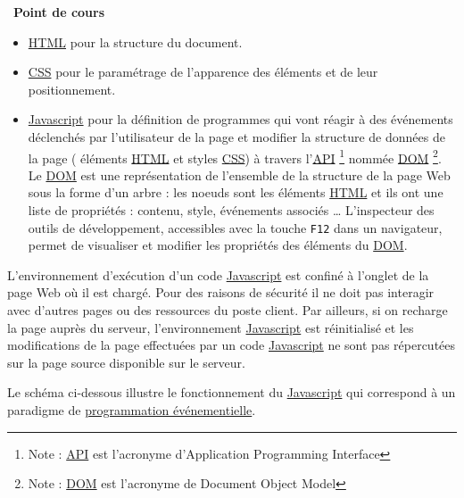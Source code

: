 \documentclass[
  11pt,
]{article}
\newcommand{\passthrough}[1]{#1}
\providecommand{\tightlist}{%
  \setlength{\itemsep}{0pt}\setlength{\parskip}{0pt}}
\newcounter{prop}
\newcounter{cours}
\newenvironment{cours}[1]
{\par \medskip   \addtocounter{cours}{1} \noindent  
\begin{bclogo}[arrondi =0.1,  ombre = true, barre=none, logo=\bcbook, marge=4]{~\textbf{Point de cours} \textbf{\thecours} {\itshape #1} }  \par}
{
\end{bclogo}
 \par \bigskip }
\newcounter{prog}
\begin{document}
\begin{cours}{}
\begin{itemize}
\tightlist
\item
  \href{https://developer.mozilla.org/fr/docs/Glossaire/HTML}{HTML} pour
  la structure du document.
\item
  \href{https://developer.mozilla.org/fr/docs/Glossaire/CSS}{CSS} pour
  le paramétrage de l'apparence des éléments et de leur positionnement.
\item
  \href{https://developer.mozilla.org/fr/docs/Glossaire/JavaScript}{Javascript}
  pour la définition de programmes qui vont réagir à des événements
  déclenchés par l'utilisateur de la page et modifier la structure de
  données de la page ( éléments
  \href{https://developer.mozilla.org/fr/docs/Glossaire/HTML}{HTML} et
  styles
  \href{https://developer.mozilla.org/fr/docs/Glossaire/CSS}{CSS}) à
  travers
  l'\href{https://developer.mozilla.org/fr/docs/Glossaire/API}{API}
  \footnote{Note :
    \href{https://developer.mozilla.org/fr/docs/Glossaire/API}{API} est
    l'acronyme d'Application Programming Interface} nommée
  \href{https://developer.mozilla.org/fr/docs/Glossaire/DOM}{DOM}
  \footnote{Note :
    \href{https://developer.mozilla.org/fr/docs/Glossaire/DOM}{DOM} est
    l'acronyme de Document Object Model}. Le
  \href{https://developer.mozilla.org/fr/docs/Glossaire/DOM}{DOM} est
  une représentation de l'ensemble de la structure de la page Web sous
  la forme d'un arbre : les noeuds sont les éléments
  \href{https://developer.mozilla.org/fr/docs/Glossaire/HTML}{HTML} et
  ils ont une liste de propriétés : contenu, style, événements associés
  \ldots{} L'inspecteur des outils de développement, accessibles avec la
  touche \passthrough{\lstinline!F12!} dans un navigateur, permet de
  visualiser et modifier les propriétés des éléments du
  \href{https://developer.mozilla.org/fr/docs/Glossaire/DOM}{DOM}.
\end{itemize}

L'environnement d'exécution d'un code
\href{https://developer.mozilla.org/fr/docs/Glossaire/JavaScript}{Javascript}
est confiné à l'onglet de la page Web où il est chargé. Pour des raisons
de sécurité il ne doit pas interagir avec d'autres pages ou des
ressources du poste client. Par ailleurs, si on recharge la page auprès
du serveur, l'environnement
\href{https://developer.mozilla.org/fr/docs/Glossaire/JavaScript}{Javascript}
est réinitialisé et les modifications de la page effectuées par un code
\href{https://developer.mozilla.org/fr/docs/Glossaire/JavaScript}{Javascript}
ne sont pas répercutées sur la page source disponible sur le serveur.

Le schéma ci-dessous illustre le fonctionnement du
\href{https://developer.mozilla.org/fr/docs/Glossaire/JavaScript}{Javascript}
qui correspond à un paradigme de
\href{https://fr.wikipedia.org/wiki/Programmation_\%C3\%A9v\%C3\%A9nementielle}{programmation
événementielle}.

\end{cours}
\end{document}
